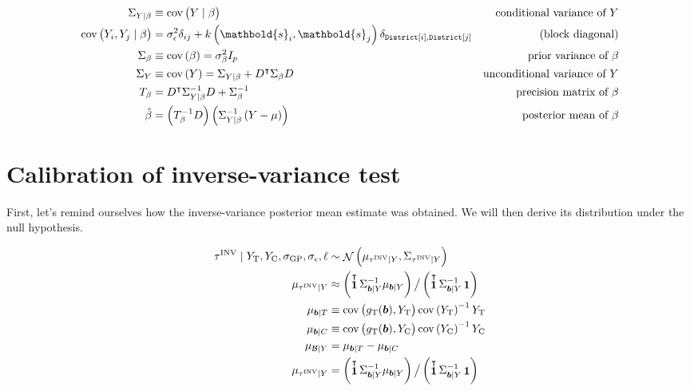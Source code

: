 \documentclass[letter]{article}
\DeclareMathOperator{\cov}{{cov}}
\DeclareMathOperator{\normal}{\mathcal{N}}
\DeclareMathOperator{\ones}{\mathbf{1}}
\newcommand{\district}{\mathtt{District}}
\newcommand{\trans}{^{\intercal}}
\newcommand{\treat}{\mathrm{T}}
\newcommand{\ctrol}{\mathrm{C}}
\newcommand{\sigmaf}{\sigma_{\mathrm{GP}}}
\newcommand{\sigman}{\sigma_{\epsilon}}
\newcommand{\svec}{\mathbold{s}}
\newcommand{\border}{\mathcal{B}}
\newcommand{\sentinels}{\bm{b}}
\newcommand{\invvar}{\tau^{\mathrm{INV}}}
\begin{document}
\begin{equation}
\begin{aligned}
    \Sigma_{Y \mid \beta} &\equiv \cov\del{Y \mid \beta } 
        & \text{conditional variance of $Y$} \\
    \cov\del{Y_i , Y_j \mid \beta } &= \sigman^2 \delta_{ij} + k\del{\svec_i,\svec_j} \delta_{\district\sbr{i},\district\sbr{j}} & \text{(block diagonal)}\\
    \Sigma_\beta &\equiv \cov\del{\beta} = \sigma_\beta^2 I_p
        & \text{prior variance of $\beta$} \\
    \Sigma_Y &\equiv \cov\del{Y} = \Sigma_{Y \mid \beta} + D\trans \Sigma_\beta D
        & \text{unconditional variance of $Y$} \\
    T_\beta &= D\trans \Sigma_{Y \mid \beta}^{-1} D + \Sigma^{-1}_\beta 
        & \text{precision matrix of $\beta$} \\
    \hat\beta &= \del{T_\beta^{-1} D} \del{ \Sigma_{Y \mid \beta}^{-1} \del{Y-\mu}}
        & \text{posterior mean of $\beta$}
\end{aligned}
\end{equation}
    


    	\section{Calibration of inverse-variance test}\label{calibration-of-inverse-variance-test}
    


    	\label{sec:calibration}
    


    	First, let's remind ourselves how the inverse-variance posterior mean estimate was obtained. We will then derive its distribution under the null hypothesis.

\begin{equation}\begin{split}
    \invvar \mid Y_\treat{}, Y_\ctrol{}, \sigmaf, \sigman, \ell &\sim \normal\del{\mu_{\invvar \mid Y}, \Sigma_{\invvar \mid Y}} \\
    \mu_{\invvar \mid Y} &\approx \del{\ones\trans \Sigma_{\sentinels \mid Y}^{-1} \mu_{\sentinels \mid Y}} \big/ \del{\ones\trans \Sigma_{\sentinels \mid Y}^{-1} \ones}  \\
    \mu_{\sentinels \mid T} &\equiv \cov\del{g_\treat{}(\sentinels), Y_\treat{}} \cov\del{Y_\treat{}}^{-1}  Y_\treat{} \\
    \mu_{\sentinels \mid C} &\equiv \cov\del{g_\treat{}(\sentinels), Y_\ctrol{}} \cov\del{Y_\ctrol{}}^{-1}  Y_\ctrol{} \\
    \mu_{\border \mid Y} &=  \mu_{\sentinels \mid T} - \mu_{\sentinels \mid C} \\
    \mu_{\invvar \mid Y} &= \del{\ones\trans \Sigma_{\sentinels \mid Y}^{-1} \mu_{\sentinels \mid Y}} \big/ \del{\ones\trans \Sigma_{\sentinels \mid Y}^{-1} \ones}  \\
\end{split}\end{equation}
    
\end{document}

